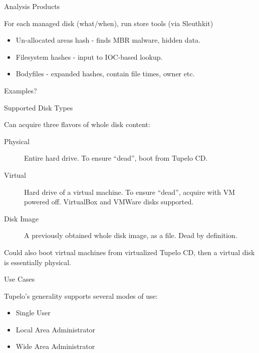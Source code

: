 \documentclass{beamer}
\begin{document}

\begin{frame}{Analysis Products}

For each managed disk (what/when), run store tools (via Sleuthkit)

\begin{itemize}
\item Un-allocated areas hash - finds MBR malware, hidden data.

\item
Filesystem hashes - input to IOC-based lookup.

\item
Bodyfiles - expanded hashes, contain file times, owner etc.

\end{itemize}

Examples?

\end{frame}


\begin{frame}{Supported Disk Types}

Can acquire three flavors of whole disk content:

\begin{description}
\item[Physical] Entire hard drive.  To ensure ``dead'', boot from
  Tupelo CD.

\item[Virtual] Hard drive of a virtual machine.  To ensure ``dead'',
  acquire with VM powered off.  VirtualBox and VMWare disks supported.

\item[Disk Image] A previously obtained whole disk image, as a file.
  Dead by definition.
\end{description}

Could also boot virtual machines from virtualized Tupelo CD, then 
a virtual disk is essentially physical.

\end{frame}


\begin{frame}{Use Cases}

Tupelo's generality supports several modes of use:

\begin{itemize}
\item 
Single User

\item
Local Area Administrator

\item
Wide Area Administrator 

\end{itemize}

\end{frame}
\end{document}
